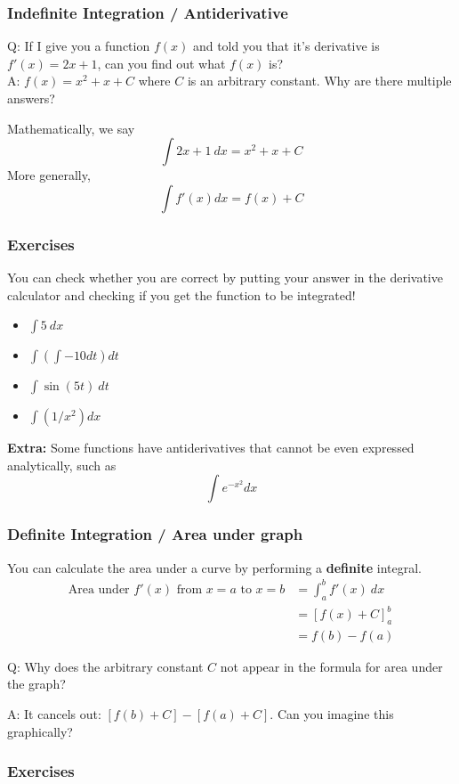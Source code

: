 \documentclass{article}
\begin{document}
\subsubsection{Indefinite Integration / Antiderivative}
Q: If I give you a function $f(x)$ and told you that it's derivative is $f'(x) = 2x + 1$, can you find out what $f(x)$ is? \\
A: $f(x) = x^2 + x + C$ where $C$ is an arbitrary constant. Why are there multiple answers?

Mathematically, we say $$\int 2x + 1\ dx = x^2 + x + C$$
More generally, $$\int f'(x) dx = f(x) + C$$

\subsubsection{Exercises}
You can check whether you are correct by putting your answer in the derivative calculator and checking if you get the function to be integrated!
\begin{itemize}
    \item $\int 5\ dx$
    \item $\int \left( \int -10 dt \right) dt$
    \item $\int \sin(5t) \ dt$
    \item $\int (1/x^2) dx$
\end{itemize}


\textbf{Extra:} Some functions have antiderivatives that cannot be even expressed analytically, such as $$\int e^{-x^2} dx$$

\subsubsection{Definite Integration / Area under graph}
You can calculate the area under a curve by performing a \textbf{definite} integral.
\begin{align}
    \text{Area under }f'(x)\text{ from }x=a\text{ to }x=b &= \int_a^b f'(x)\ dx  \\
    &= \left[f(x) + C\right]^b_a \\
    &= f(b) - f(a)
\end{align}

Q: Why does the arbitrary constant $C$ not appear in the formula for area under the graph? 

A: It cancels out: $[f(b) + C] - [f(a) + C]$. Can you imagine this graphically? 

\subsubsection{Exercises}
\end{document}

